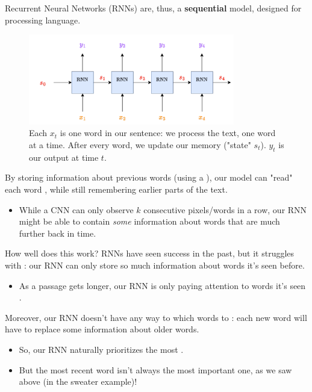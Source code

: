     Recurrent Neural Networks (RNNs) are, thus, a \textbf{sequential} model, designed for processing language.

    \begin{figure}[H]
        \centering
        \includegraphics[width=90mm,scale=0.5]{images/transformers_images/rnn_sequential.png}
        \caption*{Each $x_t$ is one word in our sentence: we process the text, one word at a time. After every word, we update our memory ("state" $s_t$). $y_t$ is our output at time $t$.}
    \end{figure}

    By storing information about previous words (using a ), our model can "read" each word , while still remembering earlier parts of the text.

    \begin{itemize}
        \item While a CNN can only observe $k$ consecutive pixels/words in a row, our RNN might be able to contain \textit{some} information about words that are much further back in time.
    \end{itemize}

    How well does this work? RNNs have seen success in the past, but it struggles with : our RNN can only store so much information about words it's seen before.

    \begin{itemize}
        \item As a passage gets longer, our RNN is only paying attention to words it's seen .
    \end{itemize}

    Moreover, our RNN doesn't have any way to  which words to : each new word will have to replace some information about older words. 

    \begin{itemize}
        \item So, our RNN naturally prioritizes the most .
            
        \item But the most recent word isn't always the most important one, as we saw above (in the sweater example)!\\
    \end{itemize}

